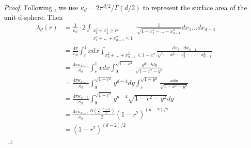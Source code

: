 \documentclass{aptpub}
\begin{document}
\begin{proof}
     Following \cite{dwyer1991convex}, we use $\kappa_d = 2\pi^{d/2}/\Gamma(d/2)$
     to represent the surface area of the unit d-sphere. Then
     \begin{align}
          \lambda_d(r) &=\frac{1}{\kappa_d} 
          \cdot 2\int_{\substack{x_1^2+x_2^2\geq r^2\\
          x_1^2+\dots+x_{d-1}^2\leq 1 }} 
          \frac{1}{\sqrt{1-x_1^2-\dots -x_{d-1}^2}} dx_1 \dots dx_{d-1}\\
      &= \frac{4\pi}{\kappa_d} \int_r^1 xdx \int_{x_3^2+\dots + x_{d-1}^2 \leq 1-x^2} \frac{dx_3\dots dx_{d-1}}
      {\sqrt{1-x^2-x_3^2-\dots -x_{d-1}^2}} \\
      &=\frac{4\pi \kappa_{d-3}}{\kappa_d} \int_r^1 xdx \int_0^{\sqrt{1-x^2}} \frac{y^{d-4}dy}{\sqrt{1-x^2-y^2}}\\
      &=\frac{4\pi \kappa_{d-3}}{\kappa_d} \int_0^{\sqrt{1-r^2}} y^{d-4}dy \int_r^{\sqrt{1-y^2}} \frac{xdx}{\sqrt{1-x^2-y^2}}\\
      &=\frac{4\pi \kappa_{d-3}}{\kappa_d} \int_0^{\sqrt{1-r^2}} y^{d-4}\sqrt{1-r^2-y^2} dy\\
      &=\frac{4\pi \kappa_{d-3}}{\kappa_d}  \frac{B(\frac{3}{2 }, \frac{d-3}{2})}{2}(1-r^2)^{(d-2)/2}\\
      &=  (1-r^2)^{(d-2)/2}
      \end{align}
\end{proof}
\end{document}
